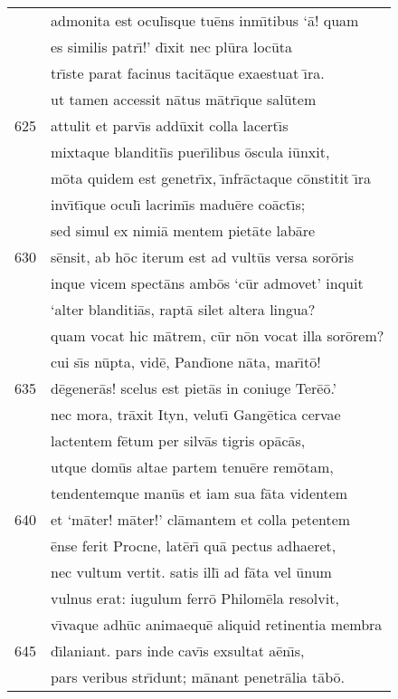 \documentclass[paper=6in:9in,pagesize=pdftex,
               headinclude=on,footinclude=on,12pt]{scrbook}
\begin{document}
\begin{longtable}[p]{ r l }
 & admonita est ocul\={\i}sque tu\=ens inm\={\i}tibus `\=a! quam\\ 
 & es similis patr\={\i}!' d\={\i}xit nec pl\=ura loc\=uta\\ 
 & tr\={\i}ste parat facinus tacit\=aque exaestuat \={\i}ra.\\ 
 & ut tamen accessit n\=atus m\=atr\={\i}que sal\=utem\\ 
625 & attulit et parv\={\i}s add\=uxit colla lacert\={\i}s\\ 
 & mixtaque blanditi\={\i}s puer\={\i}libus \=oscula i\=unxit,\\ 
 & m\=ota quidem est genetr\={\i}x, \={\i}nfr\=actaque c\=onstitit \={\i}ra\\ 
 & inv\={\i}t\={\i}que ocul\={\i} lacrim\={\i}s madu\=ere co\=act\={\i}s;\\ 
 & sed simul ex nimi\=a mentem piet\=ate lab\=are\\ 
630 & s\=ensit, ab h\=oc iterum est ad vult\=us versa sor\=oris\\ 
 & inque vicem spect\=ans amb\=os `c\=ur admovet' inquit\\ 
 & `alter blanditi\=as, rapt\=a silet altera lingua?\\ 
 & quam vocat hic m\=atrem, c\=ur n\=on vocat illa sor\=orem?\\ 
 & cui s\={\i}s n\=upta, vid\=e, Pand\={\i}one n\=ata, mar\={\i}t\=o!\\ 
635 & d\=egener\=as! scelus est piet\=as in coniuge Ter\=e\=o.'\\ 
 & nec mora, tr\=axit Ityn, velut\={\i} Gang\=etica cervae\\ 
 & lactentem f\=etum per silv\=as tigris op\=ac\=as,\\ 
 & utque dom\=us altae partem tenu\=ere rem\=otam,\\ 
 & tendentemque man\=us et iam sua f\=ata videntem\\ 
640 & et `m\=ater! m\=ater!' cl\=amantem et colla petentem\\ 
 & \=ense ferit Procne, lat\=er\={\i} qu\=a pectus adhaeret,\\ 
 & nec vultum vertit. satis ill\={\i} ad f\=ata vel \=unum\\ 
 & vulnus erat: iugulum ferr\=o Philom\=ela resolvit,\\ 
 & v\={\i}vaque adh\=uc animaequ\=e aliquid retinentia membra\\ 
645 & d\={\i}laniant. pars inde cav\={\i}s exsultat a\=en\={\i}s,\\ 
 & pars veribus str\={\i}dunt; m\=anant penetr\=alia t\=ab\=o.\\ 

\end{longtable}
\end{document}
